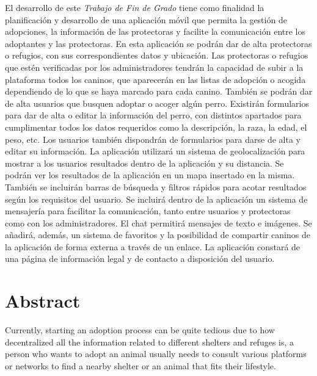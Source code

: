 \documentclass[a4paper, 12pt]{article}
\begin{document}
El desarrollo de este \textit{Trabajo de Fin de Grado} tiene como finalidad la planificación y desarrollo de una aplicación móvil que permita la gestión de adopciones, la información de las protectoras y facilite la comunicación entre los adoptantes y las protectoras. En esta aplicación se podrán dar de alta protectoras o refugios, con sus correspondientes datos y ubicación. Las protectoras o refugios que estén verificadas por los administradores tendrán la capacidad de subir a la plataforma todos los caninos, que aparecerán en las listas de adopción o acogida dependiendo de lo que se haya marcado para cada canino. También se podrán dar de alta usuarios que busquen adoptar o acoger algún perro. Existirán formularios para dar de alta o editar la información del perro, con distintos apartados para cumplimentar todos los datos requeridos como la descripción, la raza, la edad, el peso, etc. Los usuarios también dispondrán de formularios para darse de alta y editar su información. La aplicación utilizará un sistema de geolocalización para mostrar a los usuarios resultados dentro de la aplicación y su distancia. Se podrán ver los resultados de la aplicación en un mapa insertado en la misma. También se incluirán barras de búsqueda y filtros rápidos para acotar resultados según los requisitos del usuario. Se incluirá dentro de la aplicación un sistema de mensajería para facilitar la comunicación, tanto entre usuarios y protectoras como con los administradores. El chat permitirá mensajes de texto e imágenes. Se añadirá, además, un sistema de favoritos y la posibilidad de compartir caninos de la aplicación de forma externa a través de un enlace. La aplicación constará de una página de información legal y de contacto a disposición del usuario.


\newpage
\pagestyle{plain}
\thispagestyle{empty}
\mbox{}

\newpage
\pagestyle{plain}
\section*{Abstract}
Currently, starting an adoption process can be quite tedious due to how decentralized all the information related to different shelters and refuges is, a person who wants to adopt an animal usually needs to consult various platforms or networks to find a nearby shelter or an animal that fits their lifestyle.
\end{document}
